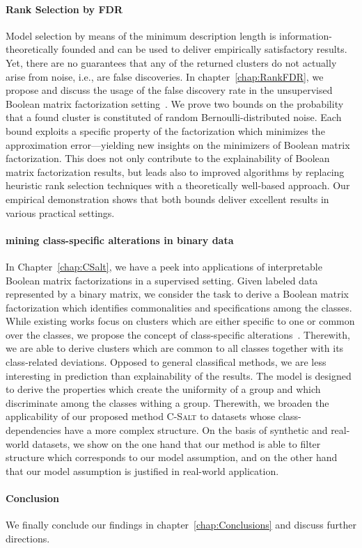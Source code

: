\paragraph{Rank Selection by FDR}
Model selection by means of the minimum description length is information-theoretically founded and can be used to deliver empirically satisfactory results.
Yet, there are no guarantees that any of the returned clusters do not actually arise from noise, i.e., are false discoveries. In chapter~\ref{chap:RankFDR}, we propose and discuss the usage of the false discovery rate in the unsupervised Boolean matrix factorization setting~\citep{hess2018trustworthy}. We prove two bounds on the probability that a found cluster is constituted of random Bernoulli-distributed noise. Each bound exploits a specific property of the factorization which minimizes the approximation error---yielding new insights on the minimizers of Boolean matrix factorization. This does not only contribute to the explainability of Boolean matrix factorization results, but leads also to improved algorithms by replacing heuristic rank selection techniques with a theoretically well-based approach. Our empirical demonstration shows that both bounds deliver excellent results in various practical settings.
\paragraph{mining class-specific alterations in binary data} In Chapter~\ref{chap:CSalt}, we have a peek into applications of interpretable Boolean matrix factorizations in a supervised setting.
Given labeled data represented by a binary matrix, we consider the task to derive a Boolean matrix factorization which identifies commonalities and specifications among the classes. While existing works focus on clusters which are either specific to one or common over the classes, we propose the concept of class-specific alterations~\citep{hess2017csalt}. Therewith, we are able to derive clusters which are common to all classes together with its class-related deviations. Opposed to general classifical methods, we are less interesting in prediction than explainability of the results. The model is designed to derive the properties which create the uniformity of a group and which discriminate among the classes withing a group. Therewith, we broaden the applicability of our proposed method \textsc{C-Salt} to datasets whose class-dependencies have a more complex structure. On the basis of synthetic and real-world datasets, we show on the one hand that our method is  able to filter structure which corresponds to our model assumption, and on the other hand that our model assumption is justified in real-world application.

\paragraph{Conclusion} We finally conclude our findings in chapter~\ref{chap:Conclusions} and discuss further directions.